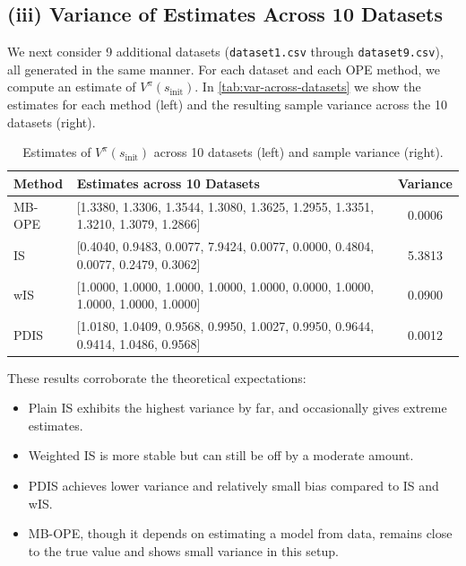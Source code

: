 \subsection*{(iii) Variance of Estimates Across 10 Datasets}
We next consider 9 additional datasets (\texttt{dataset1.csv} through \texttt{dataset9.csv}), all generated in the same manner. For each dataset and each OPE method, we compute an estimate of $V^\pi(s_{\text{init}})$. In \autoref{tab:var-across-datasets} we show the estimates for each method (left) and the resulting sample variance across the 10 datasets (right).  

\begin{table}[H]
    \centering
    \begin{tabular}{l|p{6cm}|c}
    \hline
    \textbf{Method} & \textbf{Estimates across 10 Datasets} & \textbf{Variance} \\
    \hline
    MB-OPE & 
    [1.3380, 1.3306, 1.3544, 1.3080, 1.3625, 1.2955, 1.3351, 1.3210, 1.3079, 1.2866] & 
    0.0006 \\
    IS & 
    [0.4040, 0.9483, 0.0077, 7.9424, 0.0077, 0.0000, 0.4804, 0.0077, 0.2479, 0.3062] &
    5.3813 \\
    wIS &
    [1.0000, 1.0000, 1.0000, 1.0000, 1.0000, 0.0000, 1.0000, 1.0000, 1.0000, 1.0000] &
    0.0900 \\
    PDIS &
    [1.0180, 1.0409, 0.9568, 0.9950, 1.0027, 0.9950, 0.9644, 0.9414, 1.0486, 0.9568] &
    0.0012 \\
    \hline
    \end{tabular}
    \caption{Estimates of $V^\pi(s_{\text{init}})$ across 10 datasets (left) and sample variance (right).}
    \label{tab:var-across-datasets}
\end{table}

These results corroborate the theoretical expectations:
\begin{itemize}
    \item Plain IS exhibits the highest variance by far, and occasionally gives extreme estimates.
    \item Weighted IS is more stable but can still be off by a moderate amount.
    \item PDIS achieves lower variance and relatively small bias compared to IS and wIS.
    \item MB-OPE, though it depends on estimating a model from data, remains close to the true value and shows small variance in this setup.
\end{itemize}

